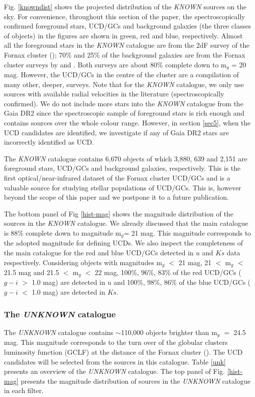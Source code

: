 \documentclass[fleqn,usenatbib]{mnras}
\begin{document}
Fig. \ref{knowndist} shows the projected distribution of the \textit{KNOWN} sources on the sky. For convenience, throughout this section of the paper, the spectroscopically confirmed foreground stars, UCD/GCs and background galaxies (the three classes of objects) in the figures are shown in green, red and blue, respectively. Almost all the foreground stars in the \textit{KNOWN} catalogue are from the 2dF survey of the Fornax cluster (\citealp{drinkwater2000}); 70\% and 25\% of the background galaxies are from the Fornax cluster surveys by \citet{drinkwater2000} and \citet{Maddox-2019}. Both surveys are about 80\% complete down to m$_g$ = 20 mag. However, the UCD/GCs in the centre of the cluster are a compilation of many other, deeper, surveys. Note that for the \textit{KNOWN} catalogue, we only use sources with available radial velocities in the literature (spectroscopically confirmed). We do not include more stars into the \textit{KNOWN} catalogue from the Gaia DR2 since the spectroscopic sample of foreground stars is rich enough and contains sources over the whole colour range. However, in section \ref{sec5}, when the UCD candidates are identified, we investigate if any of Gaia DR2 stars are incorrectly identified as UCD.

The \textit{KNOWN} catalogue contains 6,670 objects of which 3,880, 639 and 2,151 are foreground stars, UCD/GCs and background galaxies, respectively. This is the first optical/near-infrared dataset of the Fornax cluster UCD/GCs and is a valuable source for studying stellar populations of UCD/GCs. This is, however beyond the scope of this paper and we postpone it to a future publication.

The bottom panel of Fig \ref{hist-mag} shows the magnitude distribution of the sources in the \textit{KNOWN} catalogue. We already discussed that the main catalogue is 88\% complete down to magnitude m$_{g}$= 21 mag. This magnitude corresponds to the adopted magnitude for defining UCDs. We also inspect the completeness of the main catalogue for the red and blue UCD/GCs detected in $u$ and $Ks$ data respectively. Considering objects with magnitudes m$_g$ $<$ 21 mag, 21 $<$ m$_g$ $<$ 21.5 mag and 21.5 $<$ m$_g$ $<$ 22 mag, 100\%, 96\%, 83\% of the red UCD/GCs ($g-i$ $>$ 1.0 mag) are detected in $u$ and 100\%, 98\%, 86\% of the blue UCD/GCs ($g-i$ $<$ 1.0 mag) are detected in $Ks$.

\subsubsection{The \textit{UNKNOWN} catalogue}
The \textit{UNKNOWN} catalogue contains $\sim$110,000 objects brighter than m$_g$ $=$ 24.5 mag. This magnitude corresponds to the turn over of the globular clusters luminosity function (GCLF) at the distance of the Fornax cluster (\citealp{Cantiello2020}). The UCD candidates will be selected from the sources in this catalogue. Table \ref{unk} presents an overview of the \textit{UNKNOWN} catalogue. The top panel of Fig. \ref{hist-mag} presents the magnitude distribution of sources in the \textit{UNKNOWN} catalogue in each filter. 
\end{document}
